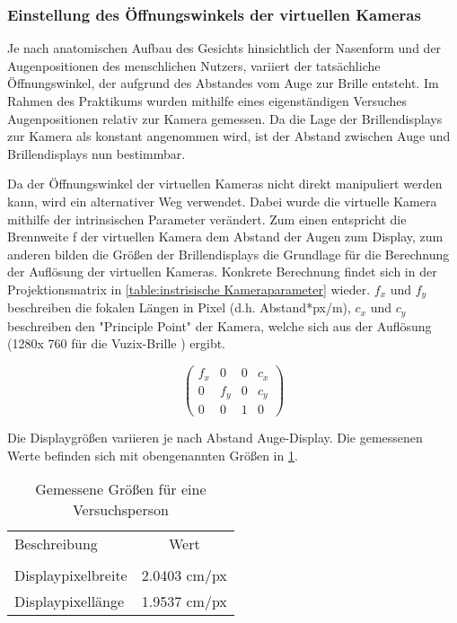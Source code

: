 \subsubsection{Einstellung des Öffnungswinkels der virtuellen Kameras}

Je nach anatomischen Aufbau des Gesichts hinsichtlich  der Nasenform und der Augenpositionen des menschlichen Nutzers, variiert der tatsächliche Öffnungswinkel, der aufgrund des Abstandes vom Auge zur Brille entsteht. Im Rahmen des Praktikums wurden mithilfe eines eigenständigen Versuches Augenpositionen relativ zur Kamera gemessen. Da die Lage der Brillendisplays zur Kamera als konstant angenommen wird, ist der Abstand zwischen Auge und Brillendisplays nun bestimmbar.

Da der Öffnungswinkel der virtuellen Kameras nicht direkt manipuliert werden kann, wird ein alternativer Weg verwendet. Dabei wurde die virtuelle Kamera mithilfe der intrinsischen Parameter verändert. Zum einen entspricht die Brennweite f der virtuellen Kamera dem Abstand der Augen zum Display, zum anderen bilden die Größen der Brillendisplays die Grundlage für die Berechnung der Auflösung der virtuellen Kameras. Konkrete Berechnung findet sich in der Projektionsmatrix in \ref{table:instrisische Kameraparameter} wieder. $f_x$ und $f_y$ beschreiben die fokalen Längen in Pixel (d.h. Abstand*px/m), $c_x$ und $c_y$ beschreiben den "Principle Point" der Kamera, welche sich aus der Auflösung (1280x 760 für die Vuzix-Brille ) ergibt. 

%

\begin{equation}
\begin{pmatrix}
f_x & 0& 0& c_x \\
0 & f_y & 0 & c_y\\ 
0 & 0&   1 &  0  
\end{pmatrix}
\label{table:instrisische Kameraparameter}
\end{equation}

Die Displaygrößen variieren je nach Abstand Auge-Display. Die gemessenen Werte befinden sich mit obengenannten Größen in \ref{table:Messwerte DisplayAuge}.
%
 \begin{table}[ht]

 \begin{tabular}{lc} 
  Beschreibung & Wert \\ \\
  Displaypixelbreite & 2.0403 cm/px \\
  Displaypixellänge &  1.9537 cm/px \\
 \end{tabular}
 \caption{Gemessene Größen für eine Versuchsperson}
 \label{table:Messwerte DisplayAuge}
 \end{table}



